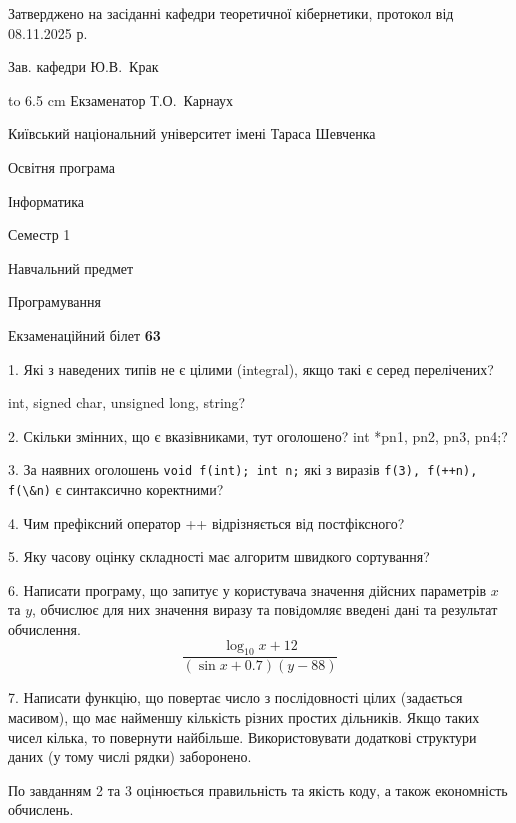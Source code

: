 \documentclass[12pt, ukrainian]{article}
\def\code#1{\Verb!#1!}
\begin{document}
{\smallskip\smallskip \begin {scriptsize} Затверджено на засіданні кафедри теоретичної кібернетики, протокол   від   08.11.2025 р.\par\smallskip\smallskip\smallskip\smallskip
{\parbox {6.5 cm} {Зав. кафедри \dotfill Ю.В.~Крак}}\hspace {0.7cm} {\hbox to 6.5 cm { Екзаменатор \dotfill Т.О.~Карнаух}} \end{scriptsize}}
\newpage
{{\begin {scriptsize}\par
{ \center  Київський національний університет імені Тараса Шевченка \par}
{\parbox {5 cm}{Освітня програма \hfill}{\parbox {7 cm}{Інформатика\hfill}}\parbox {6 cm}{\hfill Семестр 1}}\par
{\parbox {5 cm} {Навчальний предмет \hfill}\parbox {7 cm}{Програмування \hfill}\parbox {6cm}{\hfill}\par}\vspace{-15pt} \end{scriptsize}}{\center Екзаменаційний білет \No \textbf { 63 }\par}}
{%
1. Які з наведених типів не є цілими (integral), якщо такі є серед перелічених?

int, signed char, unsigned long, string?
\par
\vspace{2mm}
2. Скільки змінних, що є вказівниками, тут оголошено?
int *pn1, pn2, pn3, pn4;?
\par
\vspace{2mm}
3. За наявних оголошень \code{void f(int); int n;} які з виразів \code{f(3), f(++n), f(\&n)} є синтаксично коректними?
\par
\vspace{2mm}
4. Чим префіксний оператор ++ відрізняється від постфіксного?
\par
\vspace{2mm}
5. Яку часову оцінку складності має алгоритм швидкого сортування?
\par
\vspace{2mm}
6. Написати програму, що запитує у користувача значення дійсних параметрів $x$ та $y$, обчислює для них значення виразу та повiдомляє введенi данi та результат обчислення.
$$\frac{\log_{10} x + 12}{(\sin x + 0.7) (y - 88)}$$ 

\par
7. Написати функцію, що повертає число з послідовності цілих (задається масивом), що має найменшу кількість різних простих дільників. Якщо таких чисел кілька, то повернути найбільше. Використовувати додаткові структури даних (у тому числі рядки) заборонено.

По завданням 2 та 3 оцінюється правильність та якість коду, а також економність обчислень.

}
\end{document}
